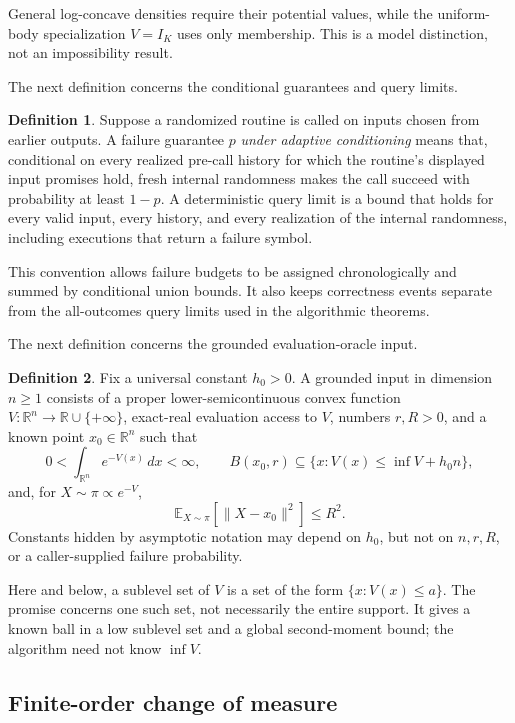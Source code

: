 \documentclass[11pt]{article}
\numberwithin{equation}{section}
\theoremstyle{definition}
\newtheorem{definition}[definition]{Definition}
\newcommand{\E}[2]{\mathbb{E}_{#1}\left[#2\right]}
\begin{document}
General log-concave densities require their potential values, while the
uniform-body specialization $V=I_K$ uses only membership.
This is a model distinction, not an impossibility result.

The next definition concerns the conditional guarantees and query limits.

\begin{definition}
\label{def:adaptive-oracle-guarantee}
Suppose a randomized routine is called on inputs chosen from earlier outputs.
A failure guarantee $p$ \emph{under adaptive conditioning} means that,
conditional on every realized pre-call history for which the routine's displayed
input promises hold, fresh internal randomness makes the call succeed with
probability at least
$1-p$.
A deterministic query limit is a bound that holds for every valid input, every
history, and every realization of the internal randomness, including executions
that return a failure symbol.
\end{definition}

This convention allows failure budgets to be assigned chronologically and summed
by conditional union bounds.
It also keeps correctness events separate from the all-outcomes query limits
used in the algorithmic theorems.

The next definition concerns the grounded evaluation-oracle input.

\begin{definition}
\label{def:grounded-input}
Fix a universal constant $h_0>0$.
A grounded input in dimension $n\geq1$ consists of a proper lower-semicontinuous
convex function
$V:\mathbb R^n\to\mathbb R\cup\{+\infty\}$, exact-real evaluation access to
$V$, numbers
$r,R>0$, and a known point
$x_0\in\mathbb R^n$ such that
\[
0
<\int_{\mathbb R^n}e^{-V(x)}\,dx
<\infty,
\qquad
B(x_0,r)\subseteq\{x:V(x)\leq\inf V+h_0n\},
\]
and, for $X\sim\pi\propto e^{-V}$,
\[
 \E{X\sim\pi}{\|X-x_0\|^2}\leq R^2.
\]
Constants hidden by asymptotic notation may depend on $h_0$, but not on
$n,r,R$, or a caller-supplied failure probability.
\end{definition}

Here and below, a sublevel set of $V$ is a set of the form
$\{x:V(x)\leq a\}$.
The promise concerns one such set, not necessarily the entire support.
It gives a known ball in a low sublevel set and a global second-moment bound;
the algorithm need not know $\inf V$.

\subsection{Finite-order change of measure}
\label{sec:prelim-renyi}
\end{document}
